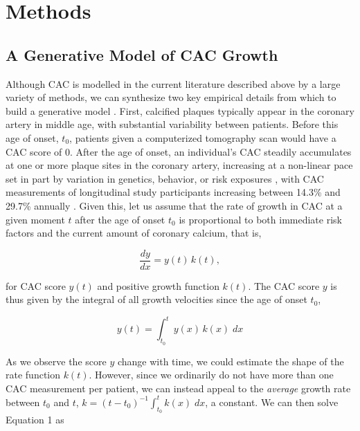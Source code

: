 \documentclass[a4paper, 10pt]{article}
\begin{document}
\section{Methods}

\subsection{A Generative Model of CAC Growth}

Although CAC is modelled in the current literature described above by a large variety of methods, we can synthesize two key empirical details from which to build a generative model \cite{gelman2021regression}. First, calcified plaques typically appear in the coronary artery in middle age, with substantial variability between patients. Before this age of onset, $t_0$, patients given a computerized tomography scan would have a CAC score of 0. After the age of onset, an individual's CAC steadily accumulates at one or more plaque sites in the coronary artery, increasing at a non-linear pace set in part by variation in genetics, behavior, or risk exposures \cite{taylor2005premature, budoff2009absolute, mcclelland2009arterial, budoff2013progression}, with CAC measurements of longitudinal study participants increasing between 14.3\% and 29.7\% annually \cite{houslay2006progressive, ikegami2018rate}. Given this, let us assume that the rate of growth in CAC at a given moment $t$ after the age of onset $t_0$ is proportional to both immediate risk factors and the current amount of coronary calcium, that is,

\begin{equation}
  \label{eq:model}
  \frac{dy}{dx} = y(t)\,k(t),
\end{equation}

for CAC score $y(t)$ and positive growth function $k(t)$. The CAC score $y$ is thus given by the integral of all growth velocities since the age of onset $t_0$,

\begin{equation}
  \label{eq:modelIntegral}
  y(t) = \int_{t_0}^{t} y(x)\,k(x)\;dx
\end{equation}

As we observe the score $y$ change with time, we could estimate the shape of the rate function $k(t)$. However, since we ordinarily do not have more than one CAC measurement per patient, we can instead appeal to the \textit{average} growth rate between $t_0$ and $t$, $k = (t - t_0)^{-1}\int_{t_0}^{t} k(x)\;dx$, a constant. We can then solve Equation 1 as
\end{document}
